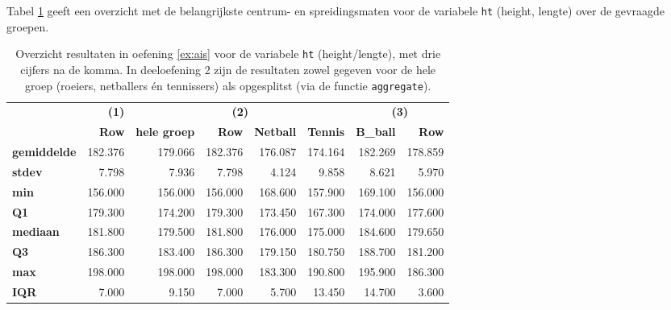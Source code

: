 Tabel \ref{tab:opl-ais-ht} geeft een overzicht met de belangrijkste centrum- en spreidingsmaten voor de variabele \texttt{ht} (height, lengte) over de gevraagde groepen.

\begin{table}
  \centering
  \begin{tabular}{@{}l|r|rrrr|rr@{}}
    \toprule
    & \textbf{(1)} & \multicolumn{4}{c}{\textbf{(2)}}                                                 & \multicolumn{2}{c}{\textbf{(3)}} \\ 
    & \textbf{Row} & \textbf{hele groep} & \textbf{Row} & \textbf{Netball} & \textbf{Tennis} & \textbf{B\_ball}  & \textbf{Row} \\ \midrule
    \textbf{gemiddelde} & 182.376      & 179.066                      & 182.376      & 176.087          & 174.164         & 182.269           & 178.859      \\
    \textbf{stdev}      & 7.798        & 7.936                        & 7.798        & 4.124            & 9.858           & 8.621             & 5.970        \\
    \textbf{min}        & 156.000      & 156.000                      & 156.000      & 168.600          & 157.900         & 169.100           & 156.000      \\
    \textbf{Q1}         & 179.300      & 174.200                      & 179.300      & 173.450          & 167.300         & 174.000           & 177.600      \\
    \textbf{mediaan}    & 181.800      & 179.500                      & 181.800      & 176.000          & 175.000         & 184.600           & 179.650      \\
    \textbf{Q3}         & 186.300      & 183.400                      & 186.300      & 179.150          & 180.750         & 188.700           & 181.200      \\
    \textbf{max}        & 198.000      & 198.000                      & 198.000      & 183.300          & 190.800         & 195.900           & 186.300      \\
    \textbf{IQR}        & 7.000        & 9.150                        & 7.000        & 5.700            & 13.450          & 14.700            & 3.600        \\ \bottomrule
  \end{tabular}
  \caption{Overzicht resultaten in oefening \ref{ex:ais} voor de variabele \texttt{ht} (height/lengte), met drie cijfers na de komma. In deeloefening 2 zijn de resultaten zowel gegeven voor de hele groep (roeiers, netballers én tennissers) als opgesplitst (via de functie \texttt{aggregate}).}
  \label{tab:opl-ais-ht}
\end{table}

